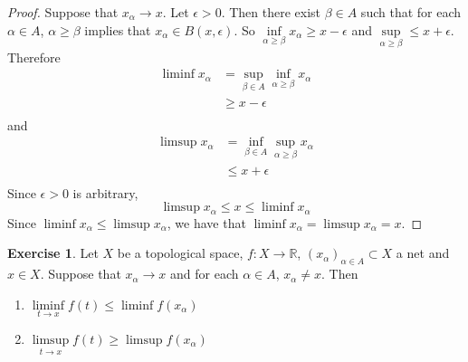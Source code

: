 \documentclass[12pt]{amsart}
\theoremstyle{definition}
\newtheorem{ex}[definition]{Exercise}
\newcommand{\al}{\alpha}
\newcommand{\be}{\beta}
\newcommand{\ep}{\epsilon}
\newcommand{\R}{\mathbb{R}}
\DeclareMathOperator*{\0}{\mbf{0}}
\DeclareMathOperator*{\1}{\mbf{1}}
\begin{document}
	\begin{proof}
		Suppose that $x_{\al} \rightarrow x$. Let $\ep >0$. Then there exist $\beta \in A$ such that for each $\al \in A$, $\al \geq \beta$ implies that $x_{\al} \in B(x, \ep)$. So $\inf\limits_{\al \geq \beta} x_{\al} \geq x - \ep$ and $\sup\limits_{\al \geq \beta} \leq x + \ep$. Therefore 
		\begin{align*}
			\liminf x_{\al} 
			&= \sup_{\beta \in A} \inf_{\al \geq \be} x_{\al} \\
			& \geq x - \ep \\
		\end{align*}
		and 
		\begin{align*}
			\limsup x_{\al} 
			&= \inf_{\beta \in A} \sup_{\al \geq \be} x_{\al} \\
			& \leq x + \ep \\
		\end{align*}
		Since $\ep >0$ is arbitrary, $$\limsup x_{\al} \leq x \leq \liminf x_{\al}$$
		Since $\liminf x_{\al} \leq \limsup x_{\al}$, we have that $\liminf x_{\al} = \limsup x_{\al} = x$.
	\end{proof}
	

	\begin{ex}
		Let $X$ be a topological space, $f:X \rightarrow \R$, $(x_{\al})_{\al \in A} \subset X$ a net and $x \in X$. Suppose that $x_{\al} \rightarrow x$ and for each $\al \in A$, $x_{\al} \neq x$. Then 
		\begin{enumerate}
			\item $\liminf\limits_{t \rightarrow x} f(t) \leq \liminf f(x_{\al})$
			\item $\limsup\limits_{t \rightarrow x} f(t) \geq \limsup f(x_{\al})$
		\end{enumerate}
	\end{ex}
\end{document}
